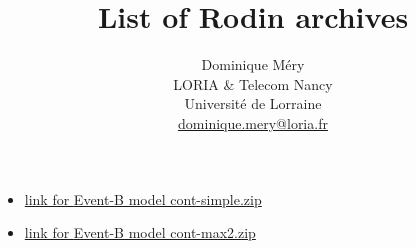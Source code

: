\documentclass[
 12pt]{article}
\title{List of Rodin archives}
\author{Dominique M\'ery\\
LORIA \& Telecom Nancy\\ Universit\'e de Lorraine\\ \url{dominique.mery@loria.fr}}
\begin{document}
  \setcounter{ex}{1}
\maketitle

\begin{itemize}
\item \href{http://mery54.github.io/fmt/models/cont-simple.zip}{link
    for  \textsf{Event-B} model cont-simple.zip}
  \item \href{http://mery54.github.io/fmt/models/cont-max2.zip}{link
    for  \textsf{Event-B} model cont-max2.zip} 
\end{itemize}
 
\end{document}
